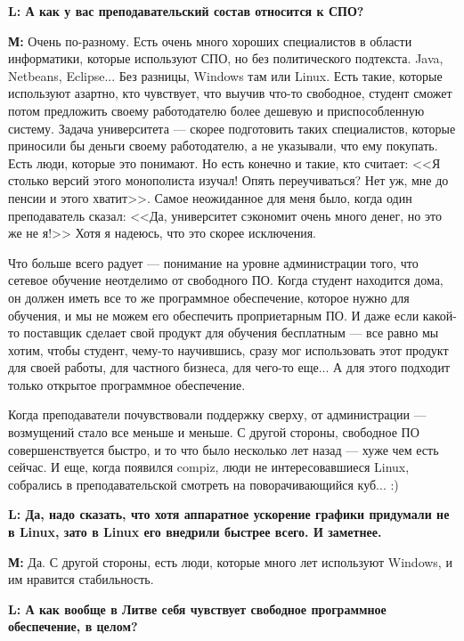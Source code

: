 \documentclass[10pt, a5paper]{article}
\begin{document}
{\noindent \bf L: А как у вас преподавательский состав относится к СПО?}

{\noindent \bf М:} Очень по-разному. Есть очень много хороших специалистов в области информатики, которые используют СПО, но без политического подтекста. Java, Netbeans, Eclipse... Без разницы, Windows там или Linux. Есть такие, которые используют азартно, кто чувствует, что выучив что-то свободное, студент сможет потом предложить своему работодателю более дешевую и приспособленную систему. Задача университета --- скорее подготовить таких специалистов, которые приносили бы деньги своему работодателю, а не указывали, что ему покупать. Есть люди, которые это понимают. Но есть конечно и такие, кто считает: <<Я столько версий этого монополиста изучал! Опять переучиваться? Нет уж, мне до пенсии и этого хватит>>. Самое неожиданное для меня было, когда один преподаватель сказал: <<Да, университет сэкономит очень много денег, но это же не я!>> Хотя я надеюсь, что это скорее исключения. 

Что больше всего радует --- понимание на уровне администрации того, что сетевое обучение неотделимо от свободного ПО. Когда студент находится дома, он должен иметь все то же программное обеспечение, которое нужно для обучения, и мы не можем его обеспечить проприетарным ПО. И даже если какой-то поставщик сделает свой продукт для обучения бесплатным --- все равно мы хотим, чтобы студент, чему-то научившись, сразу мог использовать этот продукт для своей работы, для частного бизнеса, для чего-то еще... А для этого подходит только открытое программное обеспечение. 

Когда преподаватели почувствовали поддержку сверху, от администрации --- возмущений стало все меньше и меньше. С другой стороны, свободное ПО совершенствуется быстро, и то что было несколько лет назад --- хуже чем есть сейчас. И еще, когда появился compiz, люди не интересовавшиеся Linux, собрались в преподавательской смотреть на поворачивающийся куб... :) 


{\noindent \bf L: Да, надо сказать, что хотя аппаратное ускорение графики придумали не в Linux, зато в Linux его внедрили быстрее всего. И заметнее. }

{\noindent \bf М:} Да. С другой стороны, есть люди, которые много лет используют Windows, и им нравится стабильность. 

{\noindent \bf L: А как вообще в Литве себя чувствует свободное программное обеспечение, в целом?}
\end{document}
